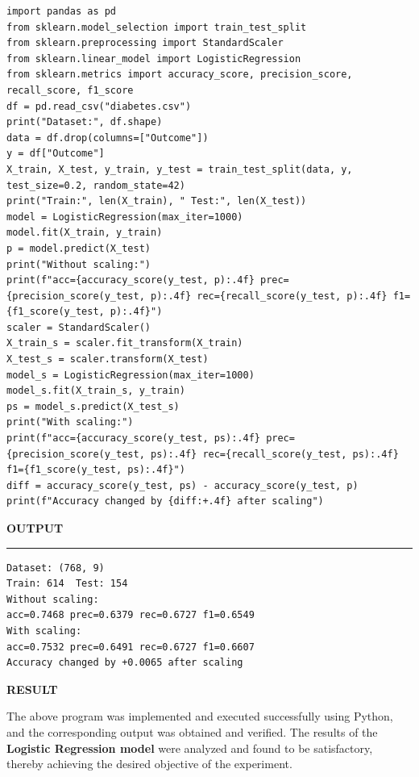 \documentclass[11pt,twoside]{article}
\newcommand{\expheading}[1]{{\fontsize{14}{17}\selectfont\textbf{#1}\par}}
\newcommand{\tooddpage}{\clearpage\ifodd\value{page}\else\null\thispagestyle{empty}\newpage\fi}
\newcommand{\toevenpage}{\clearpage\ifodd\value{page}\null\thispagestyle{empty}\newpage\fi}
\begin{document}
\begin{lstlisting}
import pandas as pd
from sklearn.model_selection import train_test_split
from sklearn.preprocessing import StandardScaler
from sklearn.linear_model import LogisticRegression
from sklearn.metrics import accuracy_score, precision_score, recall_score, f1_score
df = pd.read_csv("diabetes.csv")
print("Dataset:", df.shape)
data = df.drop(columns=["Outcome"])
y = df["Outcome"]
X_train, X_test, y_train, y_test = train_test_split(data, y, test_size=0.2, random_state=42)
print("Train:", len(X_train), " Test:", len(X_test))
model = LogisticRegression(max_iter=1000)
model.fit(X_train, y_train)
p = model.predict(X_test)
print("Without scaling:")
print(f"acc={accuracy_score(y_test, p):.4f} prec={precision_score(y_test, p):.4f} rec={recall_score(y_test, p):.4f} f1={f1_score(y_test, p):.4f}")
scaler = StandardScaler()
X_train_s = scaler.fit_transform(X_train)
X_test_s = scaler.transform(X_test)
model_s = LogisticRegression(max_iter=1000)
model_s.fit(X_train_s, y_train)
ps = model_s.predict(X_test_s)
print("With scaling:")
print(f"acc={accuracy_score(y_test, ps):.4f} prec={precision_score(y_test, ps):.4f} rec={recall_score(y_test, ps):.4f} f1={f1_score(y_test, ps):.4f}")
diff = accuracy_score(y_test, ps) - accuracy_score(y_test, p)
print(f"Accuracy changed by {diff:+.4f} after scaling")
\end{lstlisting}
\toevenpage
\expheading{OUTPUT}
\vspace{2pt}
\noindent\rule{\textwidth}{0.5pt}\par
\vspace{4pt}
\begin{verbatim}
Dataset: (768, 9)
Train: 614  Test: 154
Without scaling:
acc=0.7468 prec=0.6379 rec=0.6727 f1=0.6549
With scaling:
acc=0.7532 prec=0.6491 rec=0.6727 f1=0.6607
Accuracy changed by +0.0065 after scaling
\end{verbatim}
\vspace{4pt}

\tooddpage
\expheading{RESULT}
\vspace{4pt}
{\fontsize{12}{15}\selectfont
The above program was implemented and executed successfully using Python, and the corresponding output was obtained and verified. The results of the \textbf{Logistic Regression model} were analyzed and found to be satisfactory, thereby achieving the desired objective of the experiment.\par
}

\vspace{12pt}
\end{document}
